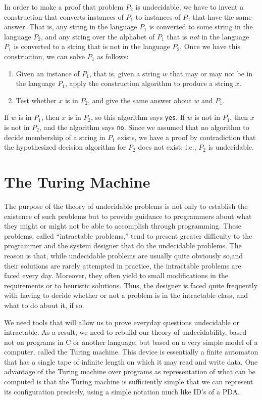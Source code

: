 \documentclass[]{article}
\begin{document}
In order to make a proof that problem $P_2$ is undecidable, we have to
invent a construction that converts instances of $P_1$ to instances of
$P_2$ that have the same answer. That is, any string in the language $P_1$
is converted to some string in the language $P_2$, and any string over the
alphabet of $P_1$ that is \emph{not} in the language $P_1$ is converted to
a string that is not in the language $P_2$. Once we have this construction,
we can solve $P_1$ as follows:
\begin{enumerate}
\item Given an instance of $P_1$, that is, given a string $w$ that may
or may not be in the language $P_1$, apply the construction algorithm
to produce a string $x$.
\item Test whether $x$ is in $P_2$, and give the same answer about $w$
and $P_1$.
\end{enumerate}

If $w$ is in $P_1$, then $x$ is in $P_2$, so this algorithm says
\texttt{yes}. If $w$ is not in $P_1$, then $x$ is not in $P_2$, and the
algorithm says \texttt{no}. Since we assumed that no algorithm to decide
membership of a string in $P_1$ exists, we have a proof by contradiction
that the hypothesized decision algorithm for $P_2$ does not exist; i.e.,
$P_2$ is undecidable.

\section*{The Turing Machine}
The purpose of the theory of undecidable problems is not only to establish
the existence of such problems but to provide guidance to programmers about
what they might or might not be able to accomplish through programming. These
problems, called ``intractable problems,'' tend to present greater difficulty
to the programmer and the system designer that do the undecidable problems.
The reason is that, while undecidable problems are usually quite obviously
so,and their solutions are rarely attempted in practice, the intractable
problems are faced every day. Moreover, they often yield to small
modifications in the requirements or to heuristic solutions. Thus, the
designer is faced quite frequently with having to decide whether or not a
problem is in the intractable class, and what to do about it, if so.

We need tools that will allow us to prove everyday questions undecidable or
intractable. As a result, we need to rebuild our theory of undecidability,
based not on programs in C or another language, but based on a very simple
model of a computer, called the Turing machine. This device is essentially a
finite automaton that has a single tape of infinite length on which it may
read and write data. One advantage of the Turing machine over programs as
representation of what can be computed is that the Turing machine is
sufficiently simple that we can represent its configuration precisely, using
a simple notation much like ID's of a PDA.
\end{document}
